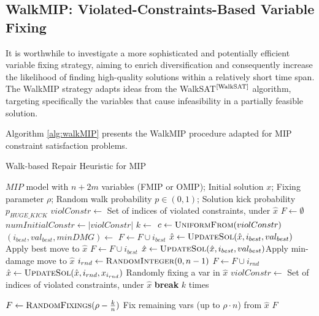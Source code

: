 \subsection{WalkMIP: Violated-Constraints-Based Variable Fixing}

It is worthwhile to investigate a more sophisticated and potentially efficient variable fixing strategy, aiming to enrich diversification and consequently increase the likelihood of finding high-quality solutions within a relatively short time span. The WalkMIP strategy adapts ideas from the WalkSAT$^\text{\cite{WalkSAT}}$ algorithm, targeting specifically the variables that cause infeasibility in a partially feasible solution. 

Algorithm \ref{alg:walkMIP} presents the WalkMIP procedure adapted for MIP constraint satisfaction problems.

\begin{algorithm}[H]
\caption{Walk-based Repair Heuristic for MIP}\label{alg:walkMIP}
\begin{algorithmic}[1]
\Require $MIP$ model with $n+2m$ variables (FMIP or OMIP); Initial solution $x$; Fixing parameter $\rho$; Random walk probability $p \in (0,1)$; Solution kick probability $p_{HUGE\_KICK}$
    \State $violConstr \gets$ Set of indices of violated constraints, under $\hat{x}$
    \State $F \gets \emptyset$
     $numInitialConstr \gets |violConstr|$\EndIf
     \Return \EndIf
        \State \Return {}
    \EndIf
    \State $k \gets $
    \Repeat
        \State $c \gets \Call{UniformFrom}{violConstr}$
        \State $(i_{best}, val_{best}, minDMG) \gets$ 
            \State $F \gets F \cup i_{best}$
            \State $\hat{x} \gets \Call{UpdateSol}{\hat{x},i_{best},val_{best}}$\Comment Apply best move to $\hat{x}$
            \State $F \gets F \cup i_{best}$
            \State $\hat{x} \gets \Call{UpdateSol}{\hat{x},i_{best},val_{best}}$\Comment Apply min-damage move to $\hat{x}$
        \Else 
            \State $i_{rnd} \gets \Call{RandomInteger}{0,n-1}$
            \State $F \gets F \cup i_{rnd}$
            \State $\hat{x} \gets \Call{UpdateSol}{\hat{x}, i_{rnd},x_{i_{rnd}}}$ \Comment Randomly fixing a var in $\hat{x}$
        \EndIf
        \State $violConstr \gets$ Set of indices of violated constraints, under $\hat{x}$
         \textbf{break} \EndIf
    \Until $k$ times

        \State $F \gets  \Call{RandomFixings}{\rho- {k\over{n}}}$ \Comment Fix remaining vars (up to $\rho \cdot n$) from $\hat{x}$
    \EndIf
    \State \Return $F$
\EndFunction
\end{algorithmic}
\end{algorithm}

